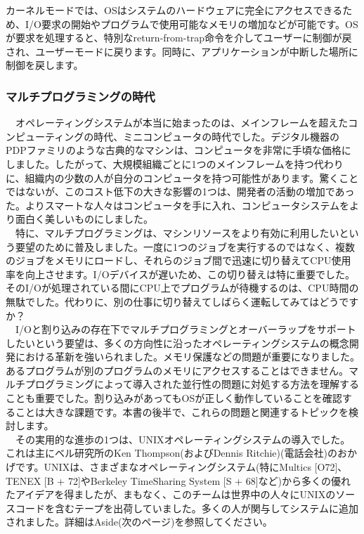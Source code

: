 カーネルモードでは、OSはシステムのハードウェアに完全にアクセスできるため、I/O要求の開始やプログラムで使用可能なメモリの増加などが可能です。OSが要求を処理すると、特別なreturn-from-trap命令を介してユーザーに制御が戻され、ユーザーモードに戻ります。同時に、アプリケーションが中断した場所に制御を戻します。

\hypertarget{ux30deux30ebux30c1ux30d7ux30edux30b0ux30e9ux30dfux30f3ux30b0ux306eux6642ux4ee3}{%
\subsubsection*{マルチプログラミングの時代}\label{ux30deux30ebux30c1ux30d7ux30edux30b0ux30e9ux30dfux30f3ux30b0ux306eux6642ux4ee3}}

　オペレーティングシステムが本当に始まったのは、メインフレームを超えたコンピューティングの時代、ミニコンピュータの時代でした。デジタル機器のPDPファミリのような古典的なマシンは、コンピュータを非常に手頃な価格にしました。したがって、大規模組織ごとに1つのメインフレームを持つ代わりに、組織内の少数の人が自分のコンピュータを持つ可能性があります。驚くことではないが、このコスト低下の大きな影響の1つは、開発者の活動の増加であった。よりスマートな人々はコンピュータを手に入れ、コンピュータシステムをより面白く美しいものにしました。\\
　特に、マルチプログラミングは、マシンリソースをより有効に利用したいという要望のために普及しました。一度に1つのジョブを実行するのではなく、複数のジョブをメモリにロードし、それらのジョブ間で迅速に切り替えてCPU使用率を向上させます。I/Oデバイスが遅いため、この切り替えは特に重要でした。そのI/Oが処理されている間にCPU上でプログラムが待機するのは、CPU時間の無駄でした。代わりに、別の仕事に切り替えてしばらく運転してみてはどうですか？\\
　I/Oと割り込みの存在下でマルチプログラミングとオーバーラップをサポートしたいという要望は、多くの方向性に沿ったオペレーティングシステムの概念開発における革新を強いられました。メモリ保護などの問題が重要になりました。あるプログラムが別のプログラムのメモリにアクセスすることはできません。マルチプログラミングによって導入された並行性の問題に対処する方法を理解することも重要でした。割り込みがあってもOSが正しく動作していることを確認することは大きな課題です。本書の後半で、これらの問題と関連するトピックを検討します。\\
　その実用的な進歩の1つは、UNIXオペレーティングシステムの導入でした。これは主にベル研究所のKen
Thompson(およびDennis
Ritchie)(電話会社)のおかげです。UNIXは、さまざまなオペレーティングシステム(特にMultics
{[}O72{]}、TENEX {[}B + 72{]}やBerkeley TimeSharing System {[}S +
68{]}など)から多くの優れたアイデアを得ましたが、まもなく、このチームは世界中の人々にUNIXのソースコードを含むテープを出荷していました。多くの人が関与してシステムに追加されました。詳細はAside(次のページ)を参照してください。

